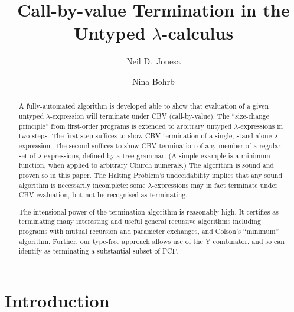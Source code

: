 \documentclass{LMCS}
\theoremstyle{definition}\newtheorem{env}[thm]{Environment}
\begin{document}
\title{Call-by-value Termination in the Untyped $\lambda$-calculus}

\author[N.~D.~Jones]{Neil D.~Jones\rsuper a}
\address{{\lsuper a}DIKU, University of Copenhagen, Denmark}

\author[N.~Bohr]{Nina Bohr\rsuper b}
\address{{\lsuper b}IT-University of Copenhagen, Denmark}

 



\begin{abstract}
A fully-automated algorithm is developed able to show that evaluation
of a given untyped $\lambda$-expression will terminate under CBV
(call-by-value).  The ``size-change principle'' from first-order
programs is extended to arbitrary untyped $\lambda$-expressions in two
steps.  The first step suffices to show CBV termination of a single,
stand-alone $\lambda$-expression. The second suffices to show CBV
termination of any member of a regular set of $\lambda$-expressions,
defined by a tree grammar.  (A simple example is a minimum function,
when applied to arbitrary Church numerals.)  The algorithm is sound
and proven so in this paper. The Halting Problem's undecidability
implies that any sound algorithm is necessarily incomplete: some
$\lambda$-expressions may in fact terminate under CBV evaluation, but
not be recognised as terminating.

The intensional power of the termination algorithm is reasonably
high. It certifies as terminating many interesting and useful general
recursive algorithms including programs with mutual recursion and
parameter exchanges, and Colson's ``minimum'' algorithm.  Further, our
type-free approach allows use of the Y combinator, and so can identify
as terminating a substantial subset of PCF.

\end{abstract}

\maketitle
\bigskip
\bigskip

\tableofcontents\newpage

\section{Introduction}
\end{document}
